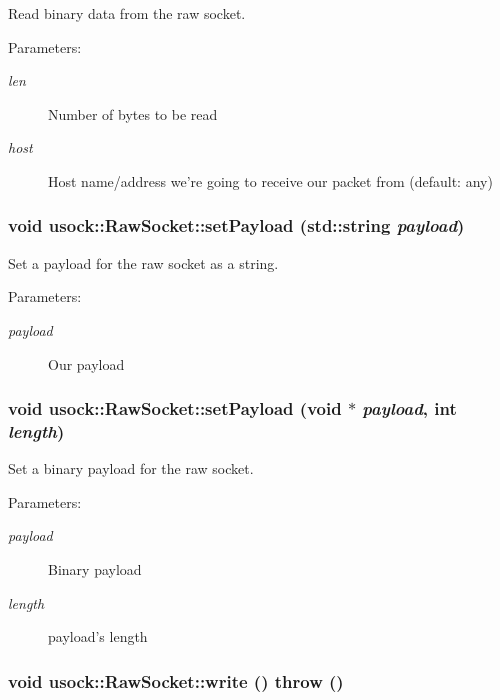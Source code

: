 Read binary data from the raw socket. 

\begin{Desc}
\item[Parameters:]
\begin{description}
\item[{\em len}]Number of bytes to be read \item[{\em host}]Host name/address we're going to receive our packet from (default: any) \end{description}
\end{Desc}
\hypertarget{classusock_1_1RawSocket_ab429ec3a150c6e15175b3223c90ade6}{
\subsubsection[{setPayload}]{\setlength{\rightskip}{0pt plus 5cm}void usock::RawSocket::setPayload (std::string {\em payload})}}
\label{classusock_1_1RawSocket_ab429ec3a150c6e15175b3223c90ade6}


Set a payload for the raw socket as a string. 

\begin{Desc}
\item[Parameters:]
\begin{description}
\item[{\em payload}]Our payload \end{description}
\end{Desc}
\hypertarget{classusock_1_1RawSocket_de9254ad3499aebabedad9b861c21bdb}{
\subsubsection[{setPayload}]{\setlength{\rightskip}{0pt plus 5cm}void usock::RawSocket::setPayload (void $\ast$ {\em payload}, \/  int {\em length})}}
\label{classusock_1_1RawSocket_de9254ad3499aebabedad9b861c21bdb}


Set a binary payload for the raw socket. 

\begin{Desc}
\item[Parameters:]
\begin{description}
\item[{\em payload}]Binary payload \item[{\em length}]payload's length \end{description}
\end{Desc}
\hypertarget{classusock_1_1RawSocket_e62377b0933a176570f226e1acbe3e16}{
\subsubsection[{write}]{\setlength{\rightskip}{0pt plus 5cm}void usock::RawSocket::write ()  throw ()}}
\label{classusock_1_1RawSocket_e62377b0933a176570f226e1acbe3e16}


